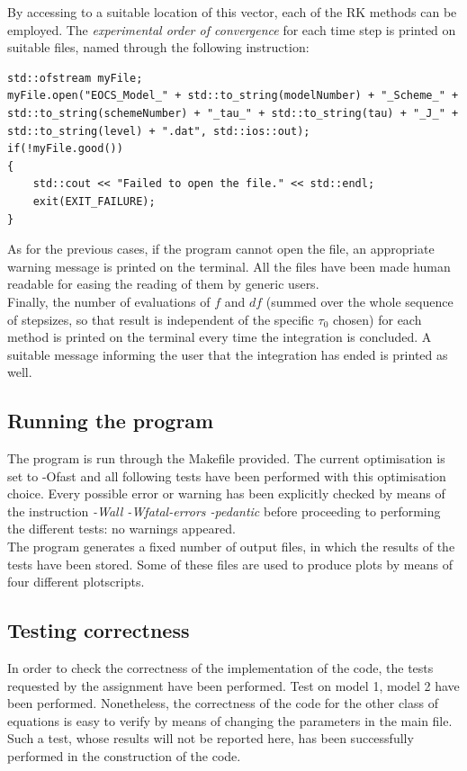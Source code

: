 \documentclass[11pt]{article}
\theoremstyle{theorem}
\theoremstyle{definition}
\begin{document}
By accessing to a suitable location of this vector, each of the RK methods can be employed. The \emph{experimental order of convergence} for each time step is printed on suitable files, named through the following instruction:

\begin{lstlisting}
std::ofstream myFile;
myFile.open("EOCS_Model_" + std::to_string(modelNumber) + "_Scheme_" + std::to_string(schemeNumber) + "_tau_" + std::to_string(tau) + "_J_" + std::to_string(level) + ".dat", std::ios::out);
if(!myFile.good())
{
	std::cout << "Failed to open the file." << std::endl;
	exit(EXIT_FAILURE);
}
\end{lstlisting}

As for the previous cases, if the program cannot open the file, an appropriate warning message is printed on the terminal. All the files have been made human readable for easing the reading of them by generic users.\\
Finally, the number of evaluations of $f$ and $df$ (summed over the whole sequence of stepsizes, so that result is independent of the specific $\tau_0$ chosen) for each method is printed on the terminal every time the integration is concluded. A suitable message informing the user that the integration has ended is printed as well.\\

\subsection{Running the program}
The program is run through the Makefile provided. The current optimisation is set to -Ofast and all following tests have been performed with this optimisation choice. Every possible error or warning has been explicitly checked by means of the instruction \emph{-Wall -Wfatal-errors -pedantic} before proceeding to performing the different tests: no warnings appeared.\\
The program generates a fixed number of output files, in which the results of the tests have been stored. Some of these files are used to produce plots by means of four different plotscripts.\\ 

\subsection{Testing correctness}
In order to check the correctness of the implementation of the code, the tests requested by the assignment have been performed. Test on model 1, model 2 have been performed. Nonetheless, the correctness of the code for the other class of equations is easy to verify by means of changing the parameters in the main file. Such a test, whose results will not be reported here, has been successfully performed in the construction of the code.\\
\end{document}
